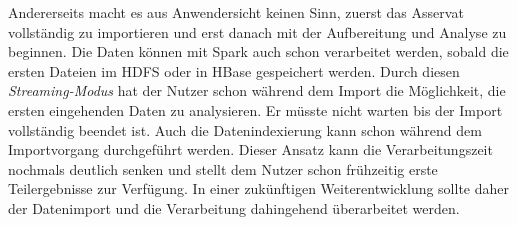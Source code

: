 \noindent
Andererseits macht es aus Anwendersicht keinen Sinn, zuerst das Asservat vollständig zu importieren und erst danach mit der Aufbereitung und Analyse zu beginnen. Die Daten können mit Spark auch schon verarbeitet werden, sobald die ersten Dateien im HDFS oder in HBase gespeichert werden. Durch diesen \textit{Streaming-Modus} hat der Nutzer schon während dem Import die Möglichkeit, die ersten eingehenden Daten zu analysieren. Er müsste nicht warten bis der Import vollständig beendet ist. Auch die Datenindexierung kann schon während dem Importvorgang durchgeführt werden. Dieser Ansatz kann die Verarbeitungszeit nochmals deutlich senken und stellt dem Nutzer schon frühzeitig erste Teilergebnisse zur Verfügung.
In einer zukünftigen Weiterentwicklung sollte daher der Datenimport und die Verarbeitung dahingehend überarbeitet werden.